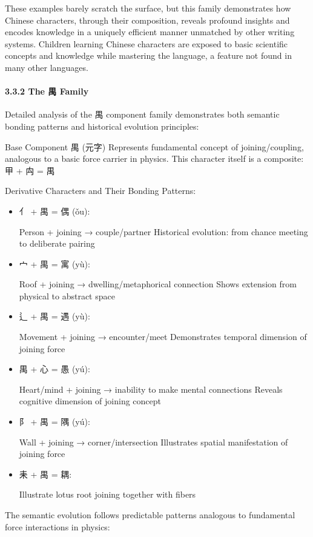 \documentclass[
]{article}
\begin{document}
These examples barely scratch the surface, but this family demonstrates
how Chinese characters, through their composition, reveals profound
insights and encodes knowledge in a uniquely efficient manner unmatched
by other writing systems. Children learning Chinese characters are
exposed to basic scientific concepts and knowledge while mastering the
language, a feature not found in many other languages.

\paragraph{3.3.2 The 禺 Family}\label{the-ux79ba-family}

Detailed analysis of the 禺 component family demonstrates both semantic
bonding patterns and historical evolution principles:

Base Component 禺 (元字) Represents fundamental concept of
joining/coupling, analogous to a basic force carrier in physics. This
character itself is a composite: 甲 + 禸 = 禺

Derivative Characters and Their Bonding Patterns:

\begin{itemize}
\item
  亻 + 禺 = 偶 (ǒu):

  Person + joining → couple/partner Historical evolution: from chance
  meeting to deliberate pairing
\item
  宀 + 禺 = 寓 (yù):

  Roof + joining → dwelling/metaphorical connection Shows extension from
  physical to abstract space
\item
  辶 + 禺 = 遇 (yù):

  Movement + joining → encounter/meet Demonstrates temporal dimension of
  joining force
\item
  禺 + 心 = 愚 (yú):

  Heart/mind + joining → inability to make mental connections Reveals
  cognitive dimension of joining concept
\item
  阝 + 禺 = 隅 (yú):

  Wall + joining → corner/intersection Illustrates spatial manifestation
  of joining force
\item
  耒 + 禺 = 耦:

  Illustrate lotus root joining together with fibers
\end{itemize}

The semantic evolution follows predictable patterns analogous to
fundamental force interactions in physics:
\end{document}
